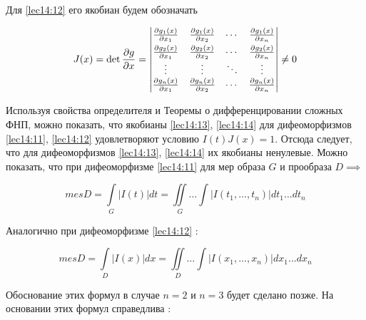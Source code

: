 \documentclass[../../main.tex]{subfiles}
\begin{document}
	
	Для \eqref{lec14:12} его якобиан будем обозначать 
	
	\begin{equation}
	\label{lec14:14}
	J(x) = \det \frac{\partial g}{\partial x}=
	\begin{vmatrix}
	\smallskip
	\frac{\partial g_1\left(x \right)}{\partial x_1} & \frac{\partial g_1\left(x 
	\right)}{\partial x_2}
	& \cdots & \frac{\partial g_1\left(x \right)}{\partial x_n} \\
	\frac{\partial g_2\left(x \right)}{\partial x_1} & \frac{\partial g_2\left(x 
	\right)}{\partial x_2} 
	& \cdots & \frac{\partial g_2\left(x \right)}{\partial x_n} \\
	\vdots  & \vdots  & \ddots & \vdots  \\
	\frac{\partial g_n\left(x \right)}{\partial x_1} & \frac{\partial g_n\left(x 
	\right)}{\partial x_2}
	& \cdots & \frac{\partial g_n\left(x \right)}{\partial x_n}
	\end{vmatrix} \ne 0
	\end{equation}
	
	Используя свойства определителя и Теоремы о дифференцировании сложных ФНП, 
	можно
	показать, что якобианы \eqref{lec14:13}, \eqref{lec14:14} для дифеоморфизмов 
	\eqref{lec14:11}, \eqref{lec14:12}
	удовлетворяют условию $I(t) J(x) = 1$.
	Отсюда следует, что для дифеоморфизмов \eqref{lec14:13}, \eqref{lec14:14} 
	их якобианы ненулевые. Можно показать, что 
	при дифеоморфизме \eqref{lec14:11} для мер образа $G$ и прообраза $D\implies$
	
	\begin{equation}
	\label{lec14:15}
	mes D = \int\limits_G \left| 
	I(t) \right|dt = \iint\limits_G \ldots \int\limits \left| 
	I\left( t_1, \ldots, t_n\right) \right| dt_1\ldots dt_n
	\end{equation} 
	
	Аналогично при дифеоморфизме \eqref{lec14:12} :
	
	\begin{equation}
	\label{lec14:16}
	mes D = \int\limits_D \left| 
	I(x) \right| dx = \iint\limits_D \ldots \int\limits \left| 
	I\left( x_1, \ldots, x_n\right) \right| dx_1\ldots dx_n
	\end{equation}
	
	Обоснование этих формул в случае $n = 2$ и $n = 3$ будет 
	сделано позже. На основании этих формул справедлива :
	
\end{document}
